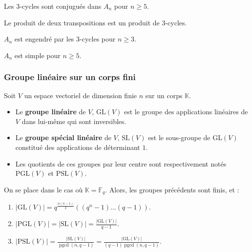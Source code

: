   \begin{lemma}
    Les $3$-cycles sont conjugués dans $A_n$ pour $n \geq 5$.
  \end{lemma}


  \begin{lemma}
    Le produit de deux transpositions est un produit de $3$-cycles.
  \end{lemma}

  \begin{proposition}
    $A_n$ est engendré par les $3$-cycles pour $n \geq 3$.
  \end{proposition}


  \begin{theorem}
    $A_n$ est simple pour $n \geq 5$.
  \end{theorem}

  \subsubsection{Groupe linéaire sur un corps fini}


  Soit $V$ un espace vectoriel de dimension finie $n$ sur un corps $\mathbb{K}$.

  \begin{definition}
    \begin{itemize}
      \item Le \textbf{groupe linéaire} de $V$, $\mathrm{GL}(V)$ est le groupe des applications linéaires de $V$ dans lui-même qui sont inversibles.
      \item Le \textbf{groupe spécial linéaire} de $V$, $\mathrm{SL}(V)$ est le sous-groupe de $\mathrm{GL}(V)$ constitué des applications de déterminant $1$.
      \item Les quotients de ces groupes par leur centre sont respectivement notés $\mathrm{PGL}(V)$ et $\mathrm{PSL}(V)$.
    \end{itemize}
  \end{definition}


  \begin{proposition}
    On se place dans le cas où $\mathbb{K} = \mathbb{F}_q$. Alors, les groupes précédents sont finis, et :
    \begin{enumerate}[label={\bfseries(\roman*)}]
      \item $|\mathrm{GL}(V)| = q^{\frac{n(n-1)}{2}}((q^n-1) \dots (q-1))$.
      \item $|\mathrm{PGL}(V)| = |\mathrm{SL}(V)| = \frac{|\mathrm{GL}(V)|}{q-1}$.
      \item $|\mathrm{PSL}(V)| = \frac{|\mathrm{SL}(V)|}{\operatorname{pgcd}(n,q-1)} = \frac{|\mathrm{GL}(V)|}{(q-1)\operatorname{pgcd}(n,q-1)}$.
    \end{enumerate}
  \end{proposition}

